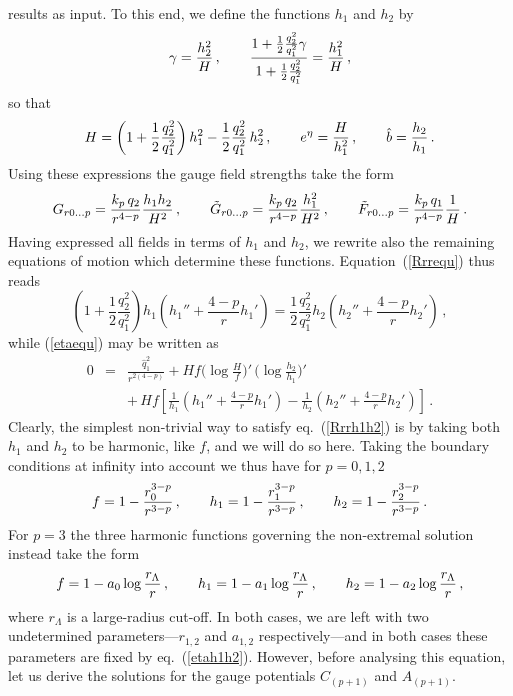 \documentclass[a4paper,11pt]{article}
\newcommand{\qh}{\hat{q}} \newcommand{\hh}{\hat{h}}
\newcommand{\eqref}[1]{(\ref{#1})}
\begin{document}
results as input. To this end, we define the functions $h_1$ and $h_2$
by
%
\begin{equation}
\label{h1h2defs}
\gamma = \frac{h_2^2}{H} \,,\qquad \frac{1+\frac{1}{2} \frac{q_2^2}{q_1^2}
\gamma }{1 +\frac{1}{2} \frac{q_2^2}{q_1^2}} = \frac{h_1^2}{H} \,,
\end{equation}
%
so that
%
\begin{equation}
\label{HetaDh1h2}
H = \left( 1 + \frac{1}{2} \frac{q_2^2}{q_1^2} \right) h_1^2 -
\frac{1}{2} \frac{q_2^2}{q_1^2}\, h_2^2 \,,\qquad e^\eta = \frac{H}{h_1^2}
\,,\qquad \hat{b} = \frac{h_2}{h_1} \,.
\end{equation}
%
Using these expressions the gauge field strengths take the form
\begin{equation}
\label{fstrengthsolsapp}
G_{r0\ldots p} = \frac{k_p\,q_2}{r^{4-p}} \frac{h_1 h_2}{H^2} \,,\qquad
\tilde{G}_{r0\ldots p} = \frac{k_p\,q_2}{r^{4-p}} \frac{h_1^2}{H^2}
\,,\qquad \tilde{F}_{r0\ldots p} = \frac{k_p\,q_1}{r^{4-p}} \frac{1}{H} \,.
\end{equation}
Having expressed all fields in terms of $h_1$ and $h_2$, we rewrite
also the remaining equations of motion which determine these
functions. Equation~\eqref{Rrrequ} thus reads
%
\begin{equation}
\label{Rrrh1h2}
\left( 1 + \frac{1}{2}\frac{q_2^2}{q_1^2} \right) h_1 \left( h_1'' +
\frac{4-p}{r} h_1' \right) = \frac{1}{2}\frac{q_2^2}{q_1^2} h_2 \left(
h_2'' + \frac{4-p}{r} h_2' \right) \,,
\end{equation}
%
while \eqref{etaequ} may be written as
%
\begin{eqnarray}
\label{etah1h2}
0 &=& \frac{\qh_1^2}{r^{2(4-p)}} + H f
 \Big(\log\frac{H}{f}\Big)'\,\Big(\log\frac{h_2}{h_1}\Big)'
 \nonumber\\[1ex] && +\, H f
 \left[\frac{1}{h_1}\left(h_1''+\frac{4-p}{r}h_1'\right) -
 \frac{1}{h_2}\left(h_2'' + \frac{4-p}{r} h_2' \right) \right] \,.
\end{eqnarray}
%
Clearly, the simplest non-trivial way to satisfy eq.~\eqref{Rrrh1h2}
is by taking both $h_1$ and $h_2$ to be harmonic, like $f$, and we
will do so here.  Taking the boundary conditions at infinity into
account we thus have for  $p=0,1,2$
%
\begin{equation}
\label{theh1h2}
f = 1 - \frac{r_0^{3-p}}{r^{3-p}} \,,\qquad h_1 = 1 -
  \frac{r_1^{3-p}}{r^{3-p}} \,,\qquad h_2 = 1-\frac{r_2^{3-p}}{r^{3-p}} \,.
\end{equation}
%
For $p=3$ the three harmonic functions governing the non-extremal
solution instead take the form
\begin{equation}
\label{theh1h23}
f= 1 - a_0 \log\frac{r_\Lambda}{r} \,,\qquad h_1 = 1 - a_1 \log
\frac{r_\Lambda}{r} \,,\qquad h_2 = 1 - a_2 \log \frac{r_\Lambda}{r}\,,
\end{equation}
where $r_\Lambda$ is a large-radius cut-off.  In both cases, we are
left with two undetermined parameters---$r_{1,2}$ and $a_{1,2}$
respectively---and in both cases these parameters are fixed by
eq.~\eqref{etah1h2}. However, before analysing this equation, let us
derive the solutions for the gauge potentials $C_{(p+1)}$ and
$A_{(p+1)}$.
\end{document}
